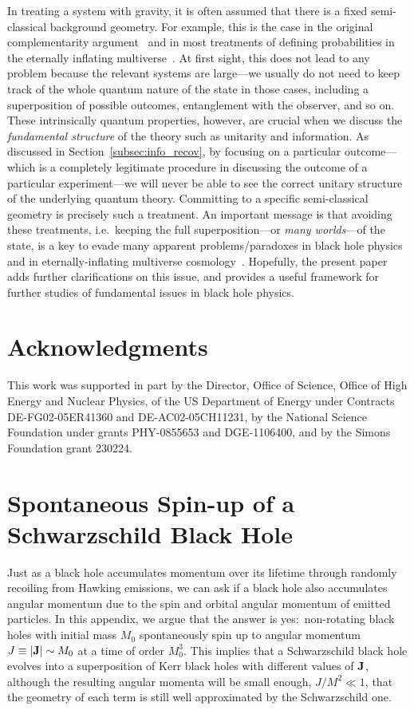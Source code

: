 \documentclass[12pt]{article}
\begin{document}
In treating a system with gravity, it is often assumed that there is a 
fixed semi-classical background geometry.  For example, this is the case 
in the original complementarity argument~\cite{Susskind:1993if} and in 
most treatments of defining probabilities in the eternally inflating 
multiverse~\cite{Guth:2000ka}.  At first sight, this does not lead to 
any problem because the relevant systems are large---we usually do not 
need to keep track of the whole quantum nature of the state in those 
cases, including a superposition of possible outcomes, entanglement 
with the observer, and so on.  These intrinsically quantum properties, 
however, are crucial when we discuss the {\it fundamental structure} 
of the theory such as unitarity and information.  As discussed 
in Section~\ref{subsec:info_recov}, by focusing on a particular 
outcome---which is a completely legitimate procedure in discussing 
the outcome of a particular experiment---we will never be able to 
see the correct unitary structure of the underlying quantum theory. 
Committing to a specific semi-classical geometry is precisely such 
a treatment.  An important message is that avoiding these treatments, 
i.e.\ keeping the full superposition---or {\it many worlds}---of the 
state, is a key to evade many apparent problems/paradoxes in black hole 
physics~\cite{Nomura:2012sw} and in eternally-inflating multiverse 
cosmology~\cite{Nomura:2011dt,Nomura:2011rb}.  Hopefully, the present 
paper adds further clarifications on this issue, and provides a useful 
framework for further studies of fundamental issues in black hole 
physics.


\section*{Acknowledgments}

This work was supported in part by the Director, Office of Science, Office 
of High Energy and Nuclear Physics, of the US Department of Energy under 
Contracts DE-FG02-05ER41360 and DE-AC02-05CH11231, by the National Science 
Foundation under grants PHY-0855653 and DGE-1106400, and by the Simons 
Foundation grant 230224.


\appendix


\section{Spontaneous Spin-up of a Schwarzschild Black Hole}
\label{app:spin}

Just as a black hole accumulates momentum over its lifetime through 
randomly recoiling from Hawking emissions, we can ask if a black hole 
also accumulates angular momentum due to the spin and orbital angular 
momentum of emitted particles.  In this appendix, we argue that the 
answer is yes:\ non-rotating black holes with initial mass $M_0$ 
spontaneously spin up to angular momentum $J \equiv |{\bf J}| \sim 
M_0$ at a time of order $M_0^3$.  This implies that a Schwarzschild black 
hole evolves into a superposition of Kerr black holes with different 
values of ${\bf J}$, although the resulting angular momenta will be 
small enough, $J/M^2 \ll 1$, that the geometry of each term is still 
well approximated by the Schwarzschild one.
\end{document}
